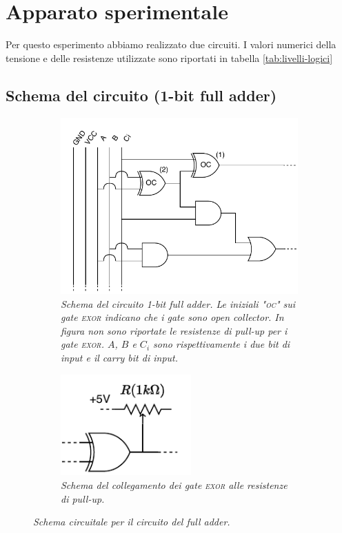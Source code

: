 \section{Apparato sperimentale}\label{sec:apparato-sperimentale}
Per questo esperimento abbiamo realizzato due circuiti.
I valori numerici della tensione e delle resistenze utilizzate sono riportati
in tabella \ref{tab:livelli-logici}

\subsection{Schema del circuito (1-bit full adder)}\label{subsec:schema-circuito}
\begin{figure}[h]
  \begin{subfigure}[t]{.66\textwidth}
    \includegraphics[width=10cm]{../assets/1bfa.drawio.pdf}
    \caption{
      \emph{
        Schema del circuito 1-bit full adder. Le iniziali "\textsc{oc}" sui gate \textsc{exor} indicano che i gate sono
        \emph{open collector}. In figura non sono riportate le resistenze di pull-up per i gate
        \textsc{exor}. $A$, $B$ e $C_i$ sono rispettivamente i due bit di input e il carry bit di input.
      }
    }
    \label{fig:circuito}
  \end{subfigure}
  \hspace{5mm}
  \begin{subfigure}[t]{.25\textwidth}
    \includegraphics[width=5cm]{../assets/oc.drawio.pdf}
    \caption{
      \emph{
        Schema del collegamento dei gate \textsc{exor} alle resistenze di pull-up.
      }
    }
    \label{fig:exor-pullup}
  \end{subfigure}
  \caption{\emph{Schema circuitale per il circuito del full adder.}}
  \label{fig:circuiti}
\end{figure}

